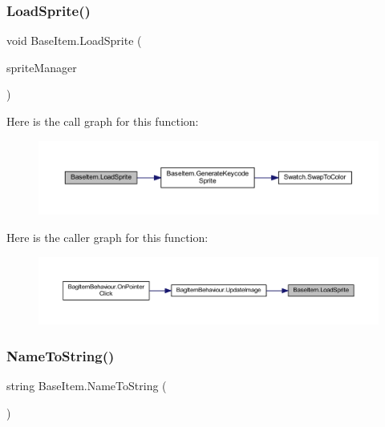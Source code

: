 \subsubsection{\texorpdfstring{LoadSprite()}{LoadSprite()}}
{\footnotesize\ttfamily void Base\+Item.\+Load\+Sprite (\begin{DoxyParamCaption}\item[{\mbox{\hyperlink{class_sprite_manager}{Sprite\+Manager}}}]{sprite\+Manager }\end{DoxyParamCaption})}

Here is the call graph for this function\+:\nopagebreak
\begin{figure}[H]
\begin{center}
\leavevmode
\includegraphics[width=350pt]{class_base_item_abedb8e41aaa0f3ee702ae8fa678204e2_cgraph}
\end{center}
\end{figure}
Here is the caller graph for this function\+:\nopagebreak
\begin{figure}[H]
\begin{center}
\leavevmode
\includegraphics[width=350pt]{class_base_item_abedb8e41aaa0f3ee702ae8fa678204e2_icgraph}
\end{center}
\end{figure}
\mbox{\label{class_base_item_a837fa537092e144e95b353e3f1ffaeb6}} 
\subsubsection{\texorpdfstring{NameToString()}{NameToString()}}
{\footnotesize\ttfamily string Base\+Item.\+Name\+To\+String (\begin{DoxyParamCaption}{ }\end{DoxyParamCaption})}

